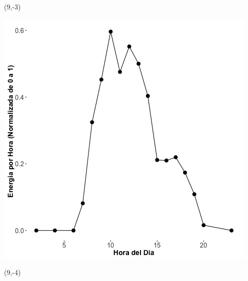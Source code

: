\documentclass{article}\usepackage[]{graphicx}\usepackage[]{color}
\newenvironment{knitrout}{}{} %
\begin{document}
 \begin{textblock}{1}(9,-3)
\begin{minipage}{20em}
\begingroup

\endgroup
\end{minipage}
\end{textblock}

 \vspace{2cm}

\begin{knitrout}
\color{fgcolor}
\includegraphics[scale=0.75]{figure/A29_fplot_norm_median} 
\end{knitrout}


 \begin{textblock}{1}(9,-4)
\begin{minipage}{20em}
\begingroup

\endgroup
\end{minipage}
\end{textblock}

 \vspace{2cm}
\end{document}
